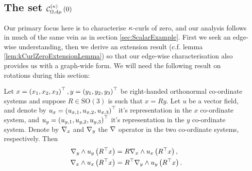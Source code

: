 \subsection{The set $\mathcal{C}_{ \Omega, \mathrm{d}\mu}^{(\kappa)}\left( 0 \right)$} \label{sec:ktCurlsZero}
Our primary focus here is to characterise $\kappa$-curls of zero, and our analysis follows in much of the same vein as in section \ref{sec:ScalarExample}.
First we seek an edge-wise understanding, then we derive an extension result (c.f. lemma \ref{lem:kCurlZeroExtensionLemma}) so that our edge-wise characterisation also provides us with a graph-wide form.
We will need the following result on rotations during this section:
\begin{lemma} \label{lem:CurlUnderRotation}
	Let $x=\left( x_1,x_2,x_3 \right)^\top, y=\left( y_1,y_2,y_3 \right)^\top$ be right-handed orthonormal co-ordinate systems and suppose $R\in\mathrm{SO}(3)$ is such that $x=Ry$.
	Let $u$ be a vector field, and denote by $u_x =\left( u_{x,1},u_{x,2},u_{x,3} \right)^\top$ it's representation in the $x$ co-ordinate system, and $u_y =\left( u_{y,1},u_{y,2},u_{y,3} \right)^\top$ it's representation in the $y$ co-ordinate system.
	Denote by $\nabla_x$ and $\nabla_y$ the $\nabla$ operator in the two co-ordinate systems, respectively.
	Then
	\begin{align*}
		\nabla_{y}\wedge u_y\left( R^\top x \right) &= R \nabla_{x}\wedge u_x\left( R^\top x \right), \\
		\nabla_{x}\wedge u_x\left( R^\top x \right) &= R^\top\nabla_{y}\wedge u_y\left( R^\top x \right).
	\end{align*}
\end{lemma}
